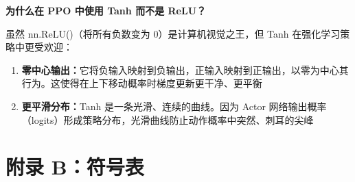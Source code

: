 \documentclass[12pt,a4paper]{article}
\theoremstyle{noteplain}
\theoremstyle{noteexercise}
\begin{document}
\textbf{为什么在 PPO 中使用 Tanh 而不是 ReLU？}

虽然 nn.ReLU()（将所有负数变为 0）是计算机视觉之王，但 Tanh 在强化学习策略中更受欢迎：

\begin{enumerate}
  \setlength{\itemsep}{0.2em}
  \item \textbf{零中心输出：}它将负输入映射到负输出，正输入映射到正输出，以零为中心其行为。这使得在上下移动概率时梯度更新更干净、更平衡
  \item \textbf{更平滑分布：}Tanh 是一条光滑、连续的曲线。因为 Actor 网络输出概率（logits）形成策略分布，光滑曲线防止动作概率中突然、刺耳的尖峰
\end{enumerate}

\section{附录 B：符号表}\label{sec:symbols}
\end{document}
